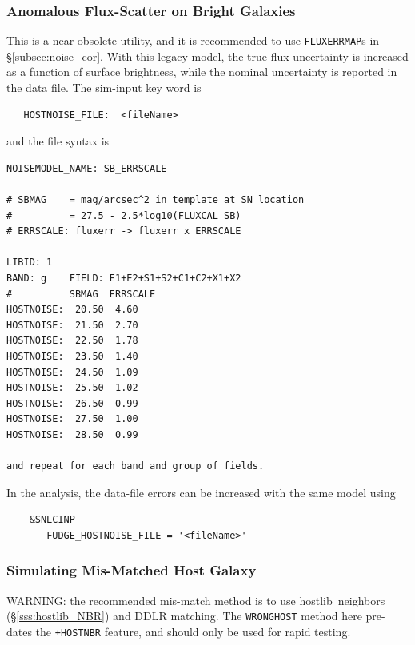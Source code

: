 \documentclass[12pt]{article}
\newcommand{\hostlib}{{\sc hostlib}}
\begin{document}
{\clearpage
\subsubsection{Anomalous Flux-Scatter on Bright Galaxies}

This is a near-obsolete utility, and it is recommended to use
{\tt FLUXERRMAP}s in \S\ref{subsec:noise_cor}.
With this legacy model, the true flux uncertainty is increased as a 
function of surface brightness, while the nominal uncertainty is 
reported in the data file.
The sim-input key word is
%
\begin{verbatim}
   HOSTNOISE_FILE:  <fileName>
\end{verbatim}
%
and the file syntax is
%
\begin{Verbatim}[frame=single]
NOISEMODEL_NAME: SB_ERRSCALE 

# SBMAG    = mag/arcsec^2 in template at SN location 
#          = 27.5 - 2.5*log10(FLUXCAL_SB) 
# ERRSCALE: fluxerr -> fluxerr x ERRSCALE 

LIBID: 1 
BAND: g    FIELD: E1+E2+S1+S2+C1+C2+X1+X2 
#          SBMAG  ERRSCALE  
HOSTNOISE:  20.50  4.60 
HOSTNOISE:  21.50  2.70 
HOSTNOISE:  22.50  1.78 
HOSTNOISE:  23.50  1.40 
HOSTNOISE:  24.50  1.09 
HOSTNOISE:  25.50  1.02 
HOSTNOISE:  26.50  0.99 
HOSTNOISE:  27.50  1.00 
HOSTNOISE:  28.50  0.99 

and repeat for each band and group of fields.
\end{Verbatim}
%
In the analysis, the data-file errors can be increased
with the same model using
\begin{verbatim}
    &SNLCINP
       FUDGE_HOSTNOISE_FILE = '<fileName>'
\end{verbatim}


   \subsubsection{Simulating Mis-Matched Host Galaxy}
   \label{sss:sim_wronghost}

WARNING: the recommended mis-match method is to use \hostlib\ neighbors
(\S\ref{sss:hostlib_NBR}) and DDLR matching. The {\tt WRONGHOST} method
here pre-dates the {\tt +HOSTNBR} feature, 
and should only be used for rapid testing.

}
\end{document}

